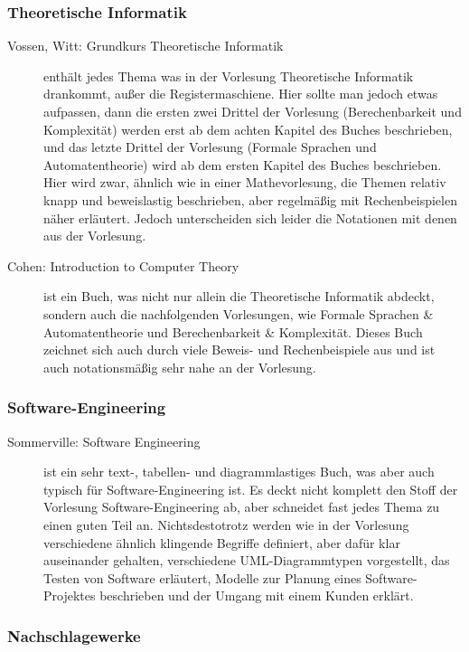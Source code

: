 \subsubsection{Theoretische Informatik}
\begin{description}
\item[Vossen, Witt: Grundkurs Theoretische Informatik]{
	enthält jedes Thema was in der Vorlesung Theoretische Informatik drankommt, außer die Registermaschiene. Hier sollte man jedoch etwas aufpassen, dann die ersten zwei Drittel der Vorlesung (Berechenbarkeit und Komplexität) werden erst ab dem achten Kapitel des Buches beschrieben, und das letzte Drittel der Vorlesung (Formale Sprachen und Automatentheorie) wird ab dem ersten Kapitel des Buches beschrieben. Hier wird zwar, ähnlich wie in einer Mathevorlesung, die Themen relativ knapp und beweislastig beschrieben, aber regelmäßig mit Rechenbeispielen näher erläutert.  Jedoch unterscheiden sich leider die Notationen mit denen aus der Vorlesung.}

\item[Cohen: Introduction to Computer Theory]{ 
	ist ein Buch, was nicht nur allein die Theoretische Informatik abdeckt, sondern auch die nachfolgenden Vorlesungen, wie Formale Sprachen \& Automatentheorie und Berechenbarkeit \& Komplexität. Dieses Buch zeichnet sich auch durch viele Beweis- und Rechenbeispiele aus und ist auch notationsmäßig sehr nahe an der Vorlesung.}
\end{description}

\subsubsection{Software-Engineering}
\begin{description}
\item[Sommerville: Software Engineering]{
	ist ein sehr text-, tabellen- und diagrammlastiges Buch, was aber auch typisch für Software-Engineering ist. Es deckt nicht komplett den Stoff der Vorlesung Software-Engineering ab, aber schneidet fast jedes Thema zu einen guten Teil an. Nichtsdestotrotz werden wie in der Vorlesung verschiedene ähnlich klingende Begriffe definiert, aber dafür klar auseinander gehalten, verschiedene UML-Diagrammtypen vorgestellt, das Testen von Software erläutert, Modelle zur Planung eines Software-Projektes beschrieben und der Umgang mit einem Kunden erklärt.}
\end{description}

\subsubsection{Nachschlagewerke}

